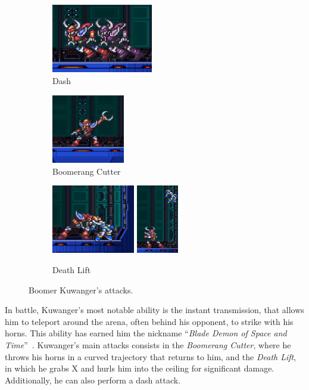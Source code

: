 \begin{figure}[htp]
	\centering
	\begin{subfigure}{0.4\linewidth}
		\centering
		\includegraphics[height=3cm]{figures/X1/Boomer_kuwanger/Boomer_dash.jpg}
		\caption{Dash}
	\end{subfigure}
	\begin{subfigure}{0.3\linewidth}
		\centering
		\includegraphics[height=3cm]{figures/X1/Boomer_kuwanger/Boomer_throw.jpg}
		\caption{Boomerang Cutter}
	\end{subfigure}
	\begin{subfigure}{\linewidth}
		\centering
		\includegraphics[height=3cm]{figures/X1/Boomer_kuwanger/Boomer_lift_1.jpg}
		\includegraphics[height=3cm]{figures/X1/Boomer_kuwanger/Boomer_lift_2.jpg}
		\caption{Death Lift}
	\end{subfigure}
	\caption{Boomer Kuwanger's attacks.}
\end{figure}
In battle, Kuwanger's most notable ability is the instant transmission, that allows him to teleport around the arena, often behind his opponent, to strike with his horns. This ability has earned him the nickname ``\textit{Blade Demon of Space and Time}''~\cite{book:MMX_Complete_art}. Kuwanger's main attacks consists in the \emph{Boomerang Cutter}, where he throws his horns in a curved trajectory that returns to him, and the \emph{Death Lift}, in which he grabs X and hurls him into the ceiling for significant damage. Additionally, he can also perform a dash attack.

